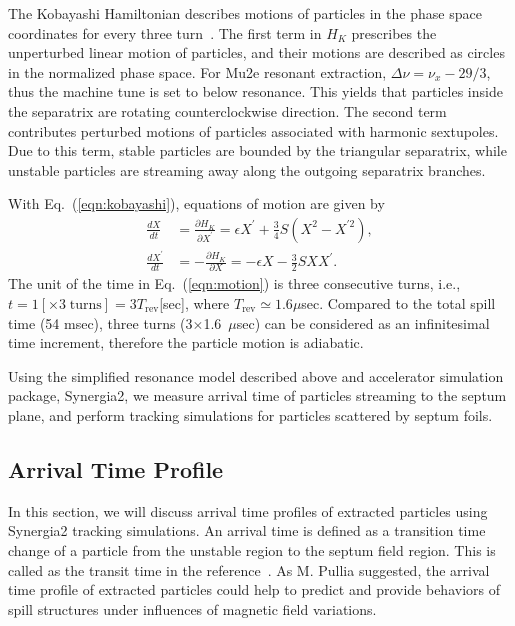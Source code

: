 \documentclass[review,1p,number,fleqn,a4paper]{elsarticle}
\begin{document}
The Kobayashi Hamiltonian describes motions of particles in the phase space coordinates for every three turn~\cite{kobayashi}.
The first term in $H_{K}$ prescribes the unperturbed linear motion of particles, and their motions are described as circles in the normalized phase space. For Mu2e resonant extraction, $\Delta \nu = \nu_{x} - 29/3$, thus the machine tune is set to below resonance. This yields that particles inside the separatrix are rotating counterclockwise direction. The second term contributes perturbed motions of particles associated with harmonic sextupoles. Due to this term, stable particles are bounded by the triangular separatrix, while unstable particles are streaming away along the outgoing separatrix branches. 

With Eq.~(\ref{eqn:kobayashi}), equations of motion are given by
\begin{equation}
 \begin{split}
  \frac{dX}{dt} & = \frac{\partial H_{K}}{\partial X^{\prime}}
                  = \epsilon X^{\prime} + \frac{3}{4} S
                    \left(
                      X^{2} - X^{\prime 2}
                    \right), \\
  \frac{dX^{\prime}}{dt} & = - \frac{\partial H_{K}}{\partial X}
                           = - \epsilon X - \frac{3}{2} S X X^{\prime}.
 \end{split}
\label{eqn:motion}
\end{equation}
The unit of the time in Eq.~(\ref{eqn:motion}) is three consecutive turns, i.e., $t = 1 [\times 3 \; \text{turns}] = 3 T_{\text{rev}}$[sec], where $T_{\text{rev}} \simeq 1.6 \mu$sec.
Compared to the total spill time (54 msec), three turns (3$\times$1.6~$\mu$sec) can be considered as an infinitesimal time increment, therefore the particle motion is adiabatic. 

Using the simplified resonance model described above and accelerator simulation package, Synergia2, we measure arrival time of particles streaming to the septum plane, and perform tracking simulations for particles scattered by septum foils.


\subsection{\label{sec:arrival}Arrival Time Profile}

In this section, we will discuss arrival time profiles of extracted particles using Synergia2 tracking simulations. An arrival time is defined as a transition time change of a particle from the unstable region to the septum field region. This is called as the transit time in the reference~\cite{pullia}. As M. Pullia suggested, the arrival time profile of extracted particles could help to predict and provide behaviors of spill structures under influences of magnetic field variations.
\end{document}
